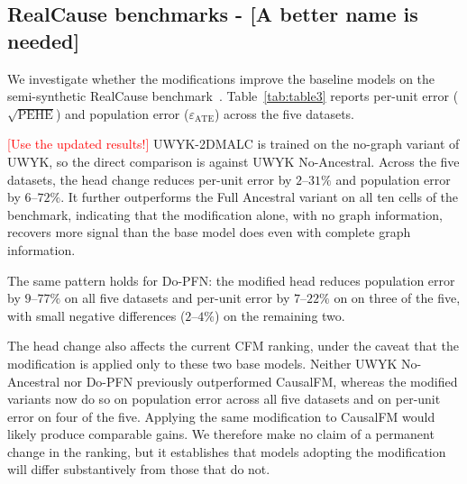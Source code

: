 \documentclass[11pt]{article}
\begin{document}
\subsection{RealCause benchmarks - [A better name is needed]}
\label{sec:res-realcause}

We investigate whether the modifications improve the baseline models on the semi-synthetic RealCause benchmark~\citep{neal2020realcause}.
Table~\ref{tab:table3} reports per-unit error ($\sqrt{\mathrm{PEHE}}$) and population error ($\varepsilon_{\mathrm{ATE}}$) across the five datasets.

\textcolor{red}{[Use the updated results!]}
UWYK-2DMALC is trained on the no-graph variant of UWYK, so the
direct comparison is against UWYK No-Ancestral. Across the five
datasets, the head change reduces per-unit error by $2$--$31\%$ and
population error by $6$--$72\%$. It further outperforms the Full
Ancestral variant on all ten cells of the benchmark, indicating
that the modification alone, with no graph information, recovers more signal than the base model does even with complete graph information.

The same pattern holds for Do-PFN: the modified head reduces population error by $9$--$77\%$ on all five datasets and per-unit error by $7$--$22\%$ on on three of the five, with small negative differences ($2$--$4\%$) on the remaining two. 

The head change also affects the current CFM ranking, under the
caveat that the modification is applied only to these two base models. Neither UWYK No-Ancestral nor Do-PFN previously outperformed
CausalFM, whereas the modified variants now do so on population
error across all five datasets and on per-unit error on four of
the five. Applying the same modification to CausalFM
would likely produce comparable gains. We therefore make no claim of a permanent change in the ranking, but it establishes that models adopting the modification will differ substantively from those that do not. 


\end{document}
